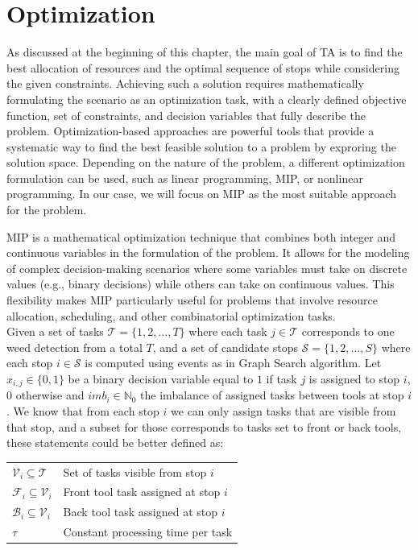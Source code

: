 \section{Optimization}
As discussed at the beginning of this chapter, the main goal of \ac{TA} is to find the best allocation of resources and the optimal sequence of stops while considering the given constraints. Achieving such a solution requires mathematically formulating the scenario as an optimization task, with a clearly defined objective function, set of constraints, and decision variables that fully describe the problem. Optimization-based approaches are powerful tools that provide a systematic way to find the best feasible solution to a problem by exproring the solution space. Depending on the nature of the problem, a different optimization formulation can be used, such as linear programming, \ac{MIP}, or nonlinear programming. In our case, we will focus on \ac{MIP} as the most suitable approach for the problem.

\ac{MIP} is a mathematical optimization technique that combines both integer and continuous variables in the formulation of the problem. It allows for the modeling of complex decision-making scenarios where some variables must take on discrete values (e.g., binary decisions) while others can take on continuous values. This flexibility makes \ac{MIP} particularly useful for problems that involve resource allocation, scheduling, and other combinatorial optimization tasks. \\

Given a set of tasks $\mathcal{T} = \{1,2,...,T\}$ where each task $j \in \mathcal{T}$ corresponds to one weed detection from a total $T$, and a set of candidate stops $\mathcal{S} = \{1,2,...,S\}$ where each stop $i \in \mathcal{S}$ is computed using events as in Graph Search algorithm. Let $x_{i,j} \in \{0,1\} $ be a binary decision variable equal to $1$ if task $j$ is assigned to stop $i$, $0$ otherwise and ${imb}_i \in \mathbb{N}_0$ the imbalance of assigned tasks between tools at stop $i$. We know that from each stop $i$ we can only assign tasks that are visible from that stop, and a subset for those corresponds to tasks set to front or back tools, these statements could be better defined as:

\begin{tabular}{ll}
    $\mathcal{V}_i \subseteq \mathcal{T}$ & Set of tasks visible from stop $i$ \\
    $\mathcal{F}_i \subseteq \mathcal{V}_i$ & Front tool task assigned at stop $i$ \\
    $\mathcal{B}_i \subseteq \mathcal{V}_i$ & Back tool task assigned at stop $i$ \\
    $\tau$ & Constant processing time per task \\
\end{tabular}

